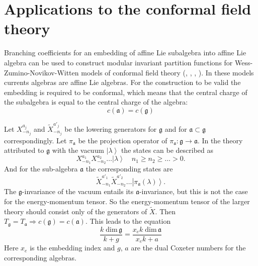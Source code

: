 \documentclass[a4paper,12pt]{article}
\theoremstyle{definition} \newtheorem{Def}{Definition}
\begin{document}
\section{Applications to the conformal field theory}
\label{sec:phys-appl}

Branching coefficients for an embedding of affine Lie subalgebra into
affine Lie algebra can be used to construct modular invariant
partition functions for Wess-Zumino-Novikov-Witten models of conformal field theory (\cite{difrancesco1997cft}, \cite{Walton:1999xc}, \cite{walton1989conformal}, \cite{schellekens1986conformal}). In these models currents algebras are affine Lie algebras.  For the construction to be valid the embedding is required to be conformal, which means that the central charge of the subalgebra is equal to the central charge of the algebra:
\begin{equation}
  \label{eq:31}
  c(\mathfrak{a})=c(\mathfrak{g})
\end{equation}


Let $X^{a_j}_{-n_j}$ and $\tilde{X}^{a'_j}_{-n_j}$ be the lowering generators for $\mathfrak{g}$ and for $\mathfrak{a}\subset\mathfrak{g}$ correspondingly. Let $\pi_{\mathfrak{a}}$ be the projection operator of $\pi_{\mathfrak{a}}:\mathfrak{g}\longrightarrow \mathfrak{a}$. In the theory attributed to $\mathfrak{g}$ with the vacuum $\left|\lambda\right>$ the states can be described as
\begin{equation}
  \label{eq:109}
  X^{a_1}_{-n_1}X^{a_2}_{-n_2}\dots\left|\lambda\right>\quad n_1\geq n_2\geq \dots>0.
\end{equation}
And for the sub-algebra $\mathfrak{a}$ the corresponding states are
\begin{equation}
  \label{eq:110}
  \tilde{X}^{a'_1}_{-n_1}\tilde{X}^{a'_2}_{-n_2}\dots\left|\pi_{\mathfrak{a}}(\lambda)\right>.
\end{equation}
The $\mathfrak{g}$-invariance of the vacuum entails its $\mathfrak{a}$-invariance, but this is not the case for the energy-momentum tensor. So the energy-momentum tensor of the larger theory should consist only of the generators of $\tilde{X}$. Then $T_{\mathfrak{g}}=T_{\mathfrak{a}}\Rightarrow c(\mathfrak{g})=c(\mathfrak{a})$. This leads to the equation
\begin{equation}
  \label{eq:111}
  \frac{k\;\mathrm{dim}\,\mathfrak{g}}{k+g}=\frac{x_e k\; \mathrm{dim}\,\mathfrak{a}}{x_ek+a}
\end{equation}
Here $x_e$ is the embedding index and $g$, $a$ are the dual Coxeter numbers for the  corresponding algebras.
\end{document}
